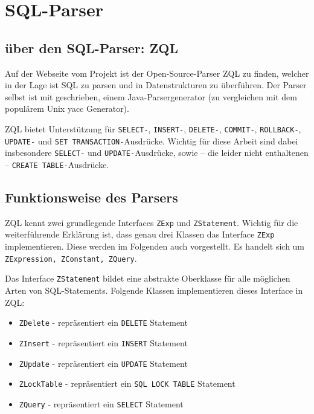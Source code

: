 \section{SQL-Parser}

\subsection{über den SQL-Parser: ZQL}

Auf der Webseite vom \cite{zql1} Projekt ist der Open-Source-Parser ZQL zu finden, welcher in der Lage ist SQL zu parsen und in Datenstrukturen zu überführen. Der Parser selbst ist mit \cite{javacc1} geschrieben, einem  Java-Parsergenerator (zu vergleichen mit dem populärem Unix yacc Generator).

ZQL bietet Unterstützung für \verb|SELECT-|, \verb|INSERT-|, \verb|DELETE-|, \verb|COMMIT-|, \verb|ROLLBACK-|, \verb|UPDATE-| und \verb|SET TRANSACTION-|Ausdrücke. Wichtig für diese Arbeit sind dabei insbesondere \verb|SELECT-| und \verb|UPDATE-|Ausdrücke, sowie -- die leider nicht enthaltenen -- \verb|CREATE TABLE-|Ausdrücke.

\subsection{Funktionsweise des Parsers}

ZQL kennt zwei grundlegende Interfaces \verb|ZExp| und \verb|ZStatement|. Wichtig für die weiterführende Erklärung ist, dass genau drei Klassen das Interface \verb|ZExp| implementieren. Diese werden im Folgenden auch vorgestellt. Es handelt sich um \verb|ZExpression, ZConstant, ZQuery|.

Das Interface \verb|ZStatement| bildet eine abstrakte Oberklasse für alle möglichen Arten von SQL-Statements. Folgende Klassen implementieren dieses Interface in ZQL:

\begin{itemize}
\item \verb|ZDelete| - repräsentiert ein \verb|DELETE| Statement
\item \verb|ZInsert| - repräsentiert ein \verb|INSERT| Statement
\item \verb|ZUpdate| - repräsentiert ein \verb|UPDATE| Statement
\item \verb|ZLockTable| - repräsentiert ein \verb|SQL LOCK TABLE| Statement
\item \verb|ZQuery| - repräsentiert ein \verb|SELECT| Statement
\end{itemize}

